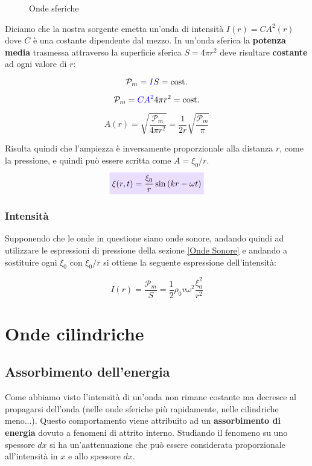 \documentclass[x11names]{report}
\newcommand{\incfig}[1]{%
	\def\svgwidth{\columnwidth}
	{#1.pdf_tex}
}
\newcommand{\viola}[1]{\colorbox{yred}{$\displaystyle #1$}}
\begin{document}
	
	\begin{figure}[ht]
		\centering
		\scalebox{.7}{\incfig{sfera}}
		\caption{Onde sferiche}
		\label{fig:Onde sferiche}
	\end{figure}
	
	\noindent
	Diciamo che la nostra sorgente emetta un'onda di intensità \(I(r) = CA^2(r)\) dove \(C\) è una costante dipendente dal mezzo. In un'onda sferica la \textbf{potenza media} trasmessa attraverso la superficie sferica \(S = 4\pi r^2\) deve risultare \textbf{costante} ad ogni valore di \(r\):
	
	\[ 
	\mathcal{P}_m = \textcolor{blue}{I}S = \text{cost.}
	\] 
	
	\[ 
	\mathcal{P}_m = \textcolor{blue}{CA^2}4\pi r^2 = \text{cost.}
	\]
	
	\[ 
	A(r) = \sqrt{\frac{\mathcal{P}_m}{4\pi r^2}} = \frac{1}{2r}\sqrt{\frac{\mathcal{P}_m}{\pi}}
	\]
	
	\noindent
	Risulta quindi che l'ampiezza è inversamente proporzionale alla distanza \(r\), come la pressione, e quindi può essere scritta come \(A = \xi_0 /r\).
	\begin{equation}
		\viola{\xi(r,t) = \frac{\xi_0}{r}\sin\left(kr -\omega t\right)}
	\end{equation}
	
	\subsubsection{Intensità}
	Supponendo che le onde in questione siano onde sonore, andando quindi ad utilizzare le espressioni di pressione della sezione \ref{Onde Sonore} e andando a sostituire ogni \(\xi_0\) con \(\xi_0/r\) si ottiene la seguente espressione dell'intensità:
	
	\[ 
	I(r) = \frac{\mathcal{P}_m}{S} = \frac{1}{2} \rho_0 v \omega ^2 \frac{\xi_0^2}{r^2}
	\]
	
	\section{Onde cilindriche}
	
	
	
	\newpage
	\subsection{Assorbimento dell'energia}
	Come abbiamo visto l'intensità di un'onda non rimane costante ma decresce al propagarsi dell'onda (nelle onde sferiche più rapidamente, nelle cilindriche meno...). Questo comportamento viene attribuito ad un \textbf{assorbimento di energia} dovuto a fenomeni di attrito interno. Studiando il fenomeno su uno spessore \(dx\) si ha un'aattenuazione che può essere considerata proporzionale all'intensità in \(x\) e allo spessore \(dx\).
	
\end{document}
